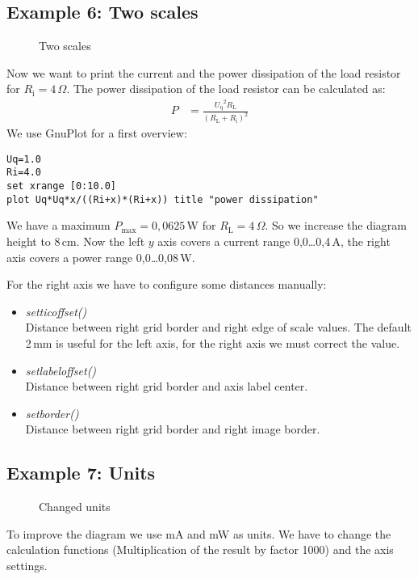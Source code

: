 \documentclass[origlongtable]{scrartcl}
\newcommand{\includepgfimage}[2]{%
\begin{figure}%
{\centering%
\caption{#2}\label{fig:#1}%
}%
\end{figure}%
}
\begin{document}

\clearpage
\subsection[Two scales]{Example 6: Two scales}
\includepgfimage{../examples/test006a}{Two scales}
Now we want to print the current and the power dissipation of the
load resistor for \(R_{\text{i}}=4\,\Omega\).
The power dissipation of the load resistor can be calculated as:
\begin{align*}P&=\frac{{U_{\text{q}}}^2R_{\text{L}}}{{(R_{\text{L}}+R_{\text{i}})}^2}\end{align*}
We use GnuPlot for a first overview:
\begin{lstlisting}[language=GnuPlot]
Uq=1.0
Ri=4.0
set xrange [0:10.0]
plot Uq*Uq*x/((Ri+x)*(Ri+x)) title "power dissipation"
\end{lstlisting}
We have a maximum \(P_{\text{max}}=0,0625\,\text{W}\) for
\(R_{\text{L}}=4\,\Omega\).
So we increase the diagram height to 8\,cm. Now the left \(y\) axis
covers a current range 0,0\ldots{}0,4\,A, the right axis covers a
power range 0,0\ldots{}0,08\,W.

For the right axis we have to configure some distances manually:
\begin{itemize}
\item	\textit{set\textunderscore{}tic\textunderscore{}offset()\/}\\
Distance between right grid border and right edge of scale values.
The default 2\,mm is useful for the left axis, for the right axis
we must correct the value.
\item	\textit{set\textunderscore{}label\textunderscore{}offset()\/}\\
Distance between right grid border and axis label center.
\item	\textit{set\textunderscore{}border()\/}\\
Distance between right grid border and right image border.
\end{itemize}

\clearpage
\subsection[Units]{Example 7: Units}
\includepgfimage{../examples/test007a}{Changed units}
To improve the diagram we use mA and mW as units. We have to change
the calculation functions (Multiplication of the result by factor 1000)
and the axis settings.
\end{document}
